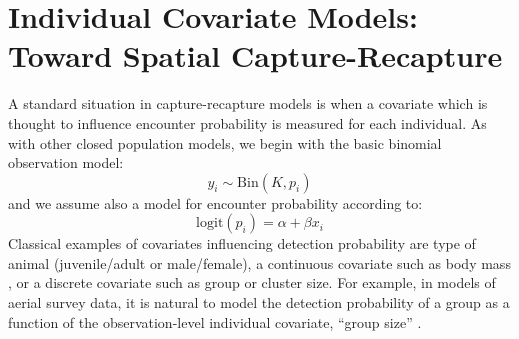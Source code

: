 \section{Individual Covariate Models: Toward Spatial Capture-Recapture}
\label{closed.sec.indcov}


A standard situation in capture-recapture models is when a
covariate which is thought
 to influence
encounter probability is measured for each individual.
As with other closed population models, we
begin with the basic binomial observation model:
\[
y_{i} \sim \mbox{Bin}(K, p_{i})
\]
and we assume also  a model for encounter probability according to:
\begin{equation}
 \mbox{logit}(p_{i}) = \alpha + \beta x_{i}
\label{closed.eq.ha}
\end{equation}
Classical examples of covariates influencing detection probability are
type of animal (juvenile/adult or male/female), a continuous covariate
such as body mass \citep[][ch. 6]{royle_dorazio:2008}, or a
discrete covariate such as group or cluster size. For example, in
models of aerial survey data, it is natural to model the detection
probability of a group as a function of the observation-level individual
covariate, ``group size'' \citep{royle:2008, royle:2009,
  langtimm_etal:2011}.

